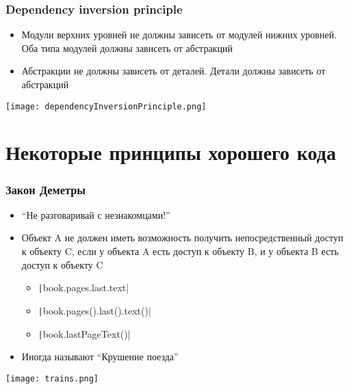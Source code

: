 \documentclass{../../slides-style}
\begin{document}
    \begin{frame}
        \frametitle{Dependency inversion principle}
        \begin{itemize}
            \item Модули верхних уровней не должны зависеть от модулей нижних уровней. Оба типа модулей должны зависеть от абстракций
            \item Абстракции не должны зависеть от деталей. Детали должны зависеть от абстракций
        \end{itemize}
        \begin{flushright}
            \texttt{[image: dependencyInversionPrinciple.png]}
        \end{flushright}
    \end{frame}

    \section{Некоторые принципы хорошего кода}

    \begin{frame}
        \frametitle{Закон Деметры}
        \begin{itemize}
            \item ``Не разговаривай с незнакомцами!''
            \item Объект A не должен иметь возможность получить непосредственный доступ к объекту C, если у объекта A есть доступ к объекту B, и у объекта B есть доступ к объекту C
            \begin{itemize}
                \item \texttt|book.pages.last.text|
                \item \texttt|book.pages().last().text()|
                \item \texttt|book.lastPageText()|
            \end{itemize}
            \item Иногда называют ``Крушение поезда''
        \end{itemize}
        \begin{flushright}
            \texttt{[image: trains.png]}
        \end{flushright}
        \vspace{-0.8cm}
    \end{frame}
\end{document}
